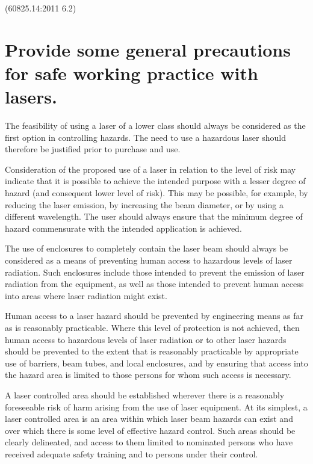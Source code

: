\documentclass[a4paper]{scrartcl}
\begin{document}
(60825.14:2011 6.2)

\section{Provide some general precautions for safe working practice with lasers.}
The feasibility of using a laser of a lower class should always be considered as the first option in controlling hazards. The need to use a hazardous laser should therefore be justified prior to purchase and use.

Consideration of the proposed use of a laser in relation to the level of risk may indicate that it is possible to achieve the intended purpose with a lesser degree of hazard (and consequent lower level of risk). This may be possible, for example, by reducing the laser emission, by increasing the beam diameter, or by using a different wavelength. The user should always ensure that the minimum degree of hazard commensurate with the intended application is achieved.

The use of enclosures to completely contain the laser beam should always be considered as a means of preventing human access to hazardous levels of laser radiation. Such enclosures include those intended to prevent the emission of laser radiation from the equipment, as well as those intended to prevent human access into areas where laser radiation might exist.

Human access to a laser hazard should be prevented by engineering means as far as is reasonably practicable. Where this level of protection is not achieved, then human access to hazardous levels of laser radiation or to other laser hazards should be prevented to the extent that is reasonably practicable by appropriate use of barriers, beam tubes, and local enclosures, and by ensuring that access into the hazard area is limited to those persons for whom such access is necessary.

A laser controlled area should be established wherever there is a reasonably foreseeable risk of harm arising from the use of laser equipment. At its simplest, a laser controlled area is an area within which laser beam hazards can exist and over which there is some level of effective hazard control. Such areas should be clearly delineated, and access to them limited to nominated persons who have received adequate safety training and to persons under their control.
\end{document}
